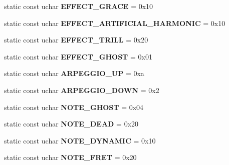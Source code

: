 \begin{DoxyCompactItemize}
static const uchar {\bfseries E\+F\+F\+E\+C\+T\+\_\+\+G\+R\+A\+CE} = 0x10
\item 
\mbox{\label{class_ms_1_1_guitar_pro_a4e7de7cc85a54810c8c32d749f227e1c}} 
static const uchar {\bfseries E\+F\+F\+E\+C\+T\+\_\+\+A\+R\+T\+I\+F\+I\+C\+I\+A\+L\+\_\+\+H\+A\+R\+M\+O\+N\+IC} = 0x10
\item 
\mbox{\label{class_ms_1_1_guitar_pro_a9dec626d0831b37254e8139f56e9d8b1}} 
static const uchar {\bfseries E\+F\+F\+E\+C\+T\+\_\+\+T\+R\+I\+LL} = 0x20
\item 
\mbox{\label{class_ms_1_1_guitar_pro_adfa99face64c58b08f8cd774285e8473}} 
static const uchar {\bfseries E\+F\+F\+E\+C\+T\+\_\+\+G\+H\+O\+ST} = 0x01
\item 
\mbox{\label{class_ms_1_1_guitar_pro_a32c66becd5b4e1372937b6ab36a8312c}} 
static const uchar {\bfseries A\+R\+P\+E\+G\+G\+I\+O\+\_\+\+UP} = 0xa
\item 
\mbox{\label{class_ms_1_1_guitar_pro_a9b5daae1c60770c8ecfc9e8aa12ab816}} 
static const uchar {\bfseries A\+R\+P\+E\+G\+G\+I\+O\+\_\+\+D\+O\+WN} = 0x2
\item 
\mbox{\label{class_ms_1_1_guitar_pro_a2efa475fd12651fb8f7f817b8b091c86}} 
static const uchar {\bfseries N\+O\+T\+E\+\_\+\+G\+H\+O\+ST} = 0x04
\item 
\mbox{\label{class_ms_1_1_guitar_pro_a059a2a94084b1ffedb5b69b561bf15ab}} 
static const uchar {\bfseries N\+O\+T\+E\+\_\+\+D\+E\+AD} = 0x20
\item 
\mbox{\label{class_ms_1_1_guitar_pro_a15152d7f7ef2989059d369e454e833e5}} 
static const uchar {\bfseries N\+O\+T\+E\+\_\+\+D\+Y\+N\+A\+M\+IC} = 0x10
\item 
\mbox{\label{class_ms_1_1_guitar_pro_a9057b4b8d6bdb399cde9475381c45b56}} 
static const uchar {\bfseries N\+O\+T\+E\+\_\+\+F\+R\+ET} = 0x20
\item 
\mbox{\label{class_ms_1_1_guitar_pro_abf9e04326621c374631aa5ff844abfa8}} 

\end{DoxyCompactItemize}
